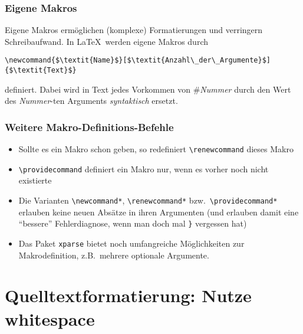 \begin{frame}[fragile]
  \frametitle{Eigene Makros}
  \onslide<+->

  Eigene Makros ermöglichen (komplexe) Formatierungen und verringern Schreibaufwand.  In
  \LaTeX\ werden eigene Makros durch
\begin{lstlisting}
\newcommand{$\textit{Name}$}[$\textit{Anzahl\_der\_Argumente}$]{$\textit{Text}$}
\end{lstlisting}
  definiert. Dabei wird in Text jedes Vorkommen von \#\emph{Nummer} durch den Wert des
  \emph{Nummer}-ten Arguments \emph{syntaktisch} ersetzt.
\end{frame}

\begin{frame}[fragile]
  \frametitle{Weitere Makro-Definitions-Befehle}


  \begin{itemize}[<+->]
  \item Sollte es ein Makro schon geben, so redefiniert \lstinline!\renewcommand!
    dieses Makro
  \item \lstinline!\providecommand! definiert ein Makro nur, wenn es vorher noch nicht
    existierte
  \item Die Varianten \lstinline!\newcommand*!, \lstinline!\renewcommand*! bzw.\,
    \lstinline!\providecommand*! erlauben keine neuen Absätze in ihren Argumenten (und
    erlauben damit eine \enquote{bessere} Fehlerdiagnose, wenn man doch mal
    \texttt{\}} vergessen hat)
  \item Das Paket \texttt{xparse} bietet noch umfangreiche Möglichkeiten zur
    Makrodefinition, z.B.\ mehrere optionale Argumente.
  \end{itemize}
\end{frame}

\section{Quelltextformatierung: Nutze whitespace}

